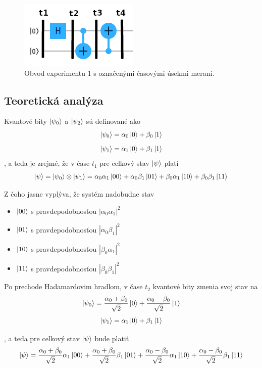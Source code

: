 \begin{figure} 
	\centering 
	\includegraphics[width=.6\textwidth]{figures/expr1_circuit.png} 
	\caption{Obvod experimentu 1 s označenými časovými úsekmi meraní.}
    \label{expr1_circuit}
\end{figure}

\subsection*{Teoretická analýza}
Kvantové bity \(\ket{\psi_0}\) a \(\ket{\psi_2}\) sú definované ako 
\[\ket{\psi_0} = \alpha_0\ket{0} + \beta_0\ket{1}\]
\[\ket{\psi_1} = \alpha_1\ket{0} + \beta_1\ket{1}\]
, a teda je zrejmé, že v čase \(t_1\) pre celkový stav \(\ket{\psi}\) platí 
\[\ket{\psi} = \ket{\psi_0} \otimes \ket{\psi_1} = \alpha_0\alpha_1\ket{00} + \alpha_0\beta_1\ket{01} + \beta_0\alpha_1\ket{10} + \beta_0\beta_1\ket{11}\]

Z čoho jasne vyplýva, že systém nadobudne stav
    \begin{itemize}
        \item[] \(\ket{00}\) s pravdepodobnosťou \(|\alpha_0\alpha_1 |^2\)
        \item[] \(\ket{01}\) s pravdepodobnosťou \(| \alpha_0\beta_1 |^2\)
        \item[] \(\ket{10}\) s pravdepodobnosťou \(| \beta_0\alpha_1 |^2\)
        \item[] \(\ket{11}\) s pravdepodobnosťou \(| \beta_0\beta_1 |^2\) 
    \end{itemize}

Po prechode Hadamardovim hradlom, v čase \(t_2\) kvantové bity zmenia svoj stav
 na
\[\ket{\psi_0} = \frac{\alpha_0 + \beta_0}{\sqrt{2}}\ket{0} + \frac{\alpha_0 - \beta_0}{\sqrt{2}}\ket{1}\]
\[\ket{\psi_1} = \alpha_1\ket{0} + \beta_1\ket{1}\]

, a teda pre celkový stav \(\ket{\psi}\) bude platiť
\[\ket{\psi} = \frac{\alpha_0 + \beta_0}{\sqrt{2}}\alpha_1\ket{00} + \frac{\alpha_0 + \beta_0}{\sqrt{2}}\beta_1\ket{01} + \frac{\alpha_0 - \beta_0}{\sqrt{2}}\alpha_1\ket{10} + \frac{\alpha_0 - \beta_0}{\sqrt{2}}\beta_1\ket{11}\]

